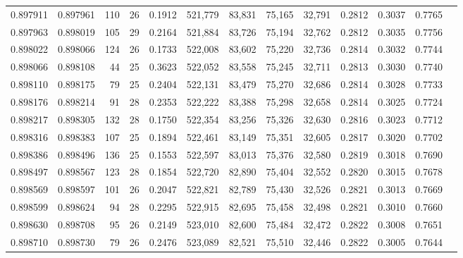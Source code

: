 \begin{tabular}{rrrrrrrrrrrrr}
0.897911 & 0.897961 &   110 &  26 &                                     0.1912 & 521,779 &  83,831 &  75,165 &  32,791 & 0.2812 & 0.3037 & 0.7765 \\
0.897963 & 0.898019 &   105 &  29 &                                     0.2164 & 521,884 &  83,726 &  75,194 &  32,762 & 0.2812 & 0.3035 & 0.7756 \\
0.898022 & 0.898066 &   124 &  26 &                                     0.1733 & 522,008 &  83,602 &  75,220 &  32,736 & 0.2814 & 0.3032 & 0.7744 \\
0.898066 & 0.898108 &    44 &  25 &                                     0.3623 & 522,052 &  83,558 &  75,245 &  32,711 & 0.2813 & 0.3030 & 0.7740 \\
0.898110 & 0.898175 &    79 &  25 &                                     0.2404 & 522,131 &  83,479 &  75,270 &  32,686 & 0.2814 & 0.3028 & 0.7733 \\
0.898176 & 0.898214 &    91 &  28 &                                     0.2353 & 522,222 &  83,388 &  75,298 &  32,658 & 0.2814 & 0.3025 & 0.7724 \\
0.898217 & 0.898305 &   132 &  28 &                                     0.1750 & 522,354 &  83,256 &  75,326 &  32,630 & 0.2816 & 0.3023 & 0.7712 \\
0.898316 & 0.898383 &   107 &  25 &                                     0.1894 & 522,461 &  83,149 &  75,351 &  32,605 & 0.2817 & 0.3020 & 0.7702 \\
0.898386 & 0.898496 &   136 &  25 &                                     0.1553 & 522,597 &  83,013 &  75,376 &  32,580 & 0.2819 & 0.3018 & 0.7690 \\
0.898497 & 0.898567 &   123 &  28 &                                     0.1854 & 522,720 &  82,890 &  75,404 &  32,552 & 0.2820 & 0.3015 & 0.7678 \\
0.898569 & 0.898597 &   101 &  26 &                                     0.2047 & 522,821 &  82,789 &  75,430 &  32,526 & 0.2821 & 0.3013 & 0.7669 \\
0.898599 & 0.898624 &    94 &  28 &                                     0.2295 & 522,915 &  82,695 &  75,458 &  32,498 & 0.2821 & 0.3010 & 0.7660 \\
0.898630 & 0.898708 &    95 &  26 &                                     0.2149 & 523,010 &  82,600 &  75,484 &  32,472 & 0.2822 & 0.3008 & 0.7651 \\
0.898710 & 0.898730 &    79 &  26 &                                     0.2476 & 523,089 &  82,521 &  75,510 &  32,446 & 0.2822 & 0.3005 & 0.7644 \\

\end{tabular}
